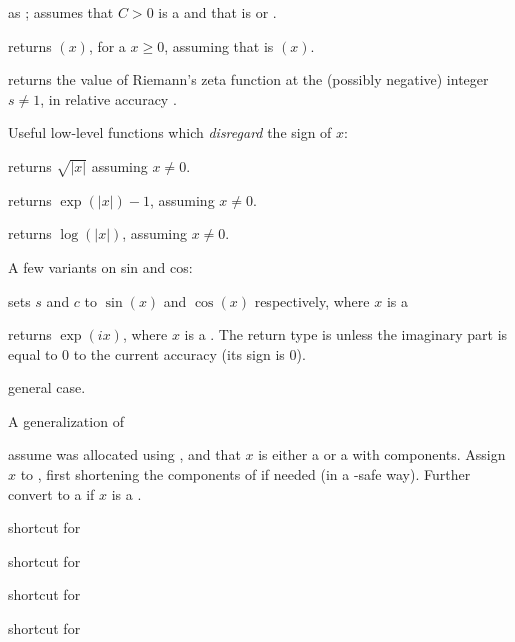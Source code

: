  as ; assumes
that $C > 0$ is a  and that  is  or .

 returns $(x)$, for a 
$x\geq 0$, assuming that  is $(x)$.

 returns the value of Riemann's zeta
function at the (possibly negative) integer $s\neq 1$, in relative accuracy .

\noindent Useful low-level functions which \emph{disregard} the sign of $x$:

 returns $\sqrt{|x|}$ assuming $x\neq 0$.

 returns $\exp(|x|) - 1$, assuming $x \neq 0$.

 returns $\log(|x|)$, assuming $x \neq 0$.

\noindent A few variants on sin and cos:

 sets $s$ and $c$ to
$\sin(x)$ and $\cos(x)$ respectively, where $x$ is a 

 returns $\exp(ix)$, where $x$ is a .
The return type is  unless the imaginary part is equal to $0$
to the current accuracy (its sign is $0$).

 general case.

\noindent A generalization of 

 assume  was allocated using
, and that $x$ is either a  or a 
with  components. Assign $x$ to , first shortening
the components of  if needed (in a -safe way). Further
convert  to a  if $x$ is a .


 shortcut for 

 shortcut for 

 shortcut for 

 shortcut for 

